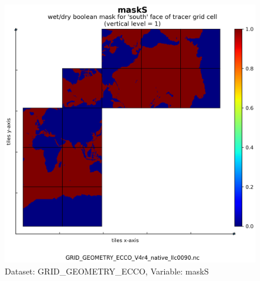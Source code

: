 \begin{figure}[H]
\centering
\includegraphics[scale=0.55]{../images/plots/native_plots_coords/Geometry_Parameters_for_the_Lat-Lon-Cap_90_(llc90)_Native_Model_Grid_(Version_4_Release_4)/maskS.png}
\caption{Dataset: GRID\_GEOMETRY\_ECCO, Variable: maskS}
\label{tab:table-GRID_GEOMETRY_ECCO_maskS-Plot}
\end{figure}
\newpage